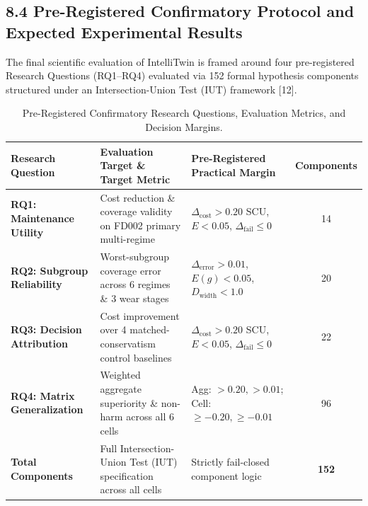 \documentclass[12pt,a4paper]{article}
\begin{document}
\subsection*{8.4 Pre-Registered Confirmatory Protocol and Expected Experimental Results}
The final scientific evaluation of IntelliTwin is framed around four pre-registered Research Questions (RQ1--RQ4) evaluated via 152 formal hypothesis components structured under an Intersection-Union Test (IUT) framework [12].

\begin{table}[htbp]
\centering
\caption{Pre-Registered Confirmatory Research Questions, Evaluation Metrics, and Decision Margins.}
\label{tab:rq_protocol}
\small
\begin{tabularx}{\textwidth}{lXlc}
\toprule
\textbf{Research Question} & \textbf{Evaluation Target \& Target Metric} & \textbf{Pre-Registered Practical Margin} & \textbf{Components} \\
\midrule
\textbf{RQ1: Maintenance Utility} & Cost reduction \& coverage validity on FD002 primary multi-regime & $\Delta_{\text{cost}} > 0.20$ SCU, $E < 0.05$, $\Delta_{\text{fail}} \le 0$ & 14 \\
\textbf{RQ2: Subgroup Reliability} & Worst-subgroup coverage error across 6 regimes \& 3 wear stages & $\Delta_{\text{error}} > 0.01$, $E(g) < 0.05$, $D_{\text{width}} < 1.0$ & 20 \\
\textbf{RQ3: Decision Attribution} & Cost improvement over 4 matched-conservatism control baselines & $\Delta_{\text{cost}} > 0.20$ SCU, $E < 0.05$, $\Delta_{\text{fail}} \le 0$ & 22 \\
\textbf{RQ4: Matrix Generalization} & Weighted aggregate superiority \& non-harm across all 6 cells & Agg: $>0.20, >0.01$; Cell: $\ge -0.20, \ge -0.01$ & 96 \\
\midrule
\textbf{Total Components} & Full Intersection-Union Test (IUT) specification across all cells & Strictly fail-closed component logic & \textbf{152} \\
\bottomrule
\end{tabularx}
\end{table}
\end{document}
